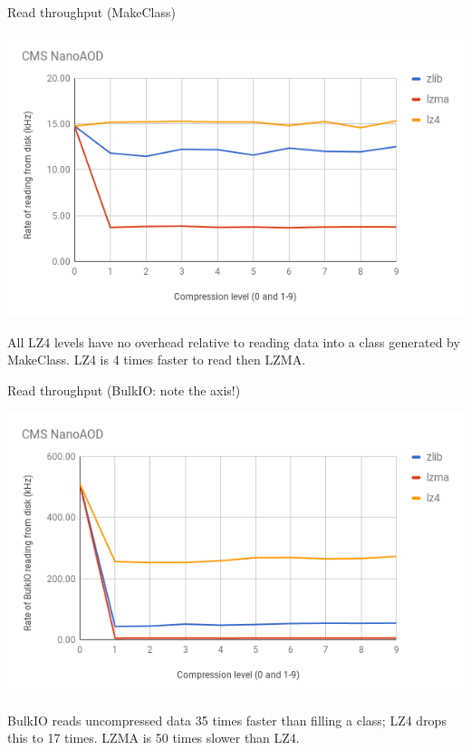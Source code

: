 \documentclass{beamer}
\begin{document}
\begin{frame}{Read throughput (MakeClass)}
\begin{center}
\includegraphics[width=\linewidth]{read-vs-compression.png}
\end{center}

All LZ4 levels have no overhead relative to reading data into a class generated by MakeClass. LZ4 is 4 times faster to read then LZMA.
\end{frame}

\begin{frame}{Read throughput (BulkIO: note the axis!)}
\begin{center}
\includegraphics[width=\linewidth]{bulk-vs-compression.png}
\end{center}

BulkIO reads uncompressed data 35 times faster than filling a class; LZ4 drops this to 17 times. LZMA is 50 times slower than LZ4.
\end{frame}
\end{document}
